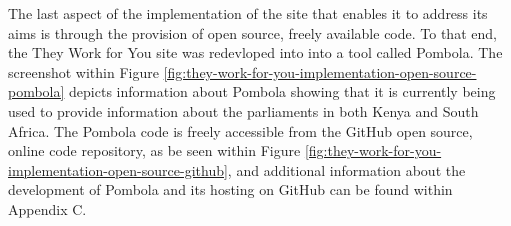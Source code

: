 The last aspect of the implementation of the site that enables it to address its aims is through the provision of open source, freely available code.
To that end, the They Work for You site was redevloped into into a tool called Pombola.
The screenshot within Figure \ref{fig:they-work-for-you-implementation-open-source-pombola} depicts information about Pombola showing that it is currently being used to provide information about the parliaments in both Kenya and South Africa.
The Pombola code \cite{mysociety-github} is freely accessible from the GitHub \cite{github} open source, online code repository, as be seen within Figure \ref{fig:they-work-for-you-implementation-open-source-github},
and additional information about the development of Pombola and its hosting on GitHub can be found within Appendix C.
